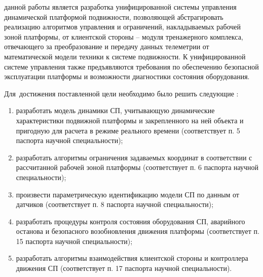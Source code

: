 {\aim} данной работы является разработка унифицированной системы управления динамической платформой подвижности, позволяющей абстрагировать реализацию алгоритмов управления и ограничений, накладываемых рабочей зоной платформы, от клиентской стороны -- модуля тренажерного комплекса, отвечающего за преобразование и передачу данных телеметрии от математической модели техники к системе подвижности. К унифицированной системе управления также предъявляются требования по обеспечению безопасной эксплуатации платформы и возможности диагностики состояния оборудования.

Для~достижения поставленной цели необходимо было решить следующие {\tasks}:
\begin{enumerate}
  \item разработать модель динамики СП, учитывающую динамические характеристики подвижной платформы и закрепленного на ней объекта и пригодную для расчета в режиме реального времени (соответствует п. 5 паспорта научной специальности);
  \item разработать алгоритмы ограничения задаваемых координат в соответствии с рассчитанной рабочей зоной платформы (соответствует п. 6 паспорта научной специальности);
  \item произвести параметрическую идентификацию модели СП по данным от датчиков (соответствует п. 8 паспорта научной специальности);
  \item разработать процедуры контроля состояния оборудования СП, аварийного останова и безопасного возобновления движения платформы (соответствует п. 15 паспорта научной специальности);
  \item разработать алгоритмы взаимодействия клиентской стороны и контроллера движения СП (соответствует п. 17 паспорта научной специальности).
\end{enumerate}

